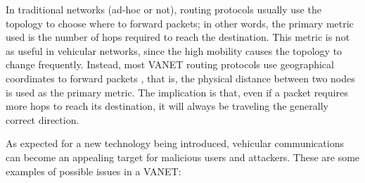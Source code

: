 

In traditional networks (ad-hoc or not), routing protocols usually use the topology to choose where to forward packets; in other words, the primary metric used is the number of hops required to reach the destination.
This metric is not as useful in vehicular networks, since the high mobility causes the topology to change frequently.
Instead, most VANET routing protocols use geographical coordinates to forward packets \citep{saini2015close}, that is, the physical distance between two nodes is used as the primary metric.
The implication is that, even if a packet requires more hops to reach its destination, it will always be traveling the generally correct direction.


As expected for a new technology being introduced, vehicular communications can become an appealing target for malicious users and attackers.
These are some examples of possible issues in a VANET:

